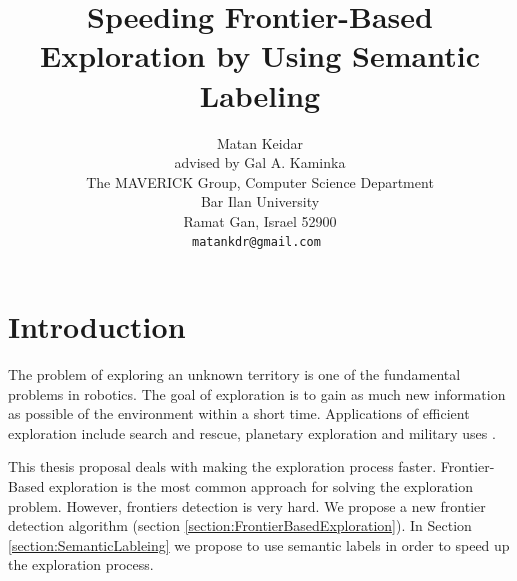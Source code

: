\documentclass[a4paper,10pt]{article}
\begin{document}
\title{Speeding Frontier-Based Exploration by Using
Semantic Labeling}
\author{Matan Keidar\\
advised by Gal A. Kaminka\\
The MAVERICK Group, Computer Science Department\\
Bar Ilan University\\
Ramat Gan, Israel 52900\\
\tt\small matankdr@gmail.com
}

\tableofcontents
\maketitle

\section{Introduction}
The problem of exploring an unknown territory is one of the fundamental
problems in robotics. The goal of exploration is to gain as much new information
as possible of the environment within a short time. Applications of efficient
exploration include search and rescue, planetary exploration
\cite{apostolopoulos2001robotic} and military uses \cite{hougen2000miniature}.



This thesis proposal deals with making the exploration process faster.
Frontier-Based exploration is the most common approach for solving the
exploration problem. However, frontiers detection is very hard. We propose a
new frontier detection algorithm (section
\ref{section:FrontierBasedExploration}). In Section
\ref{section:SemanticLableing} we propose to use semantic labels in
order to speed up the exploration process. 


\end{document}
